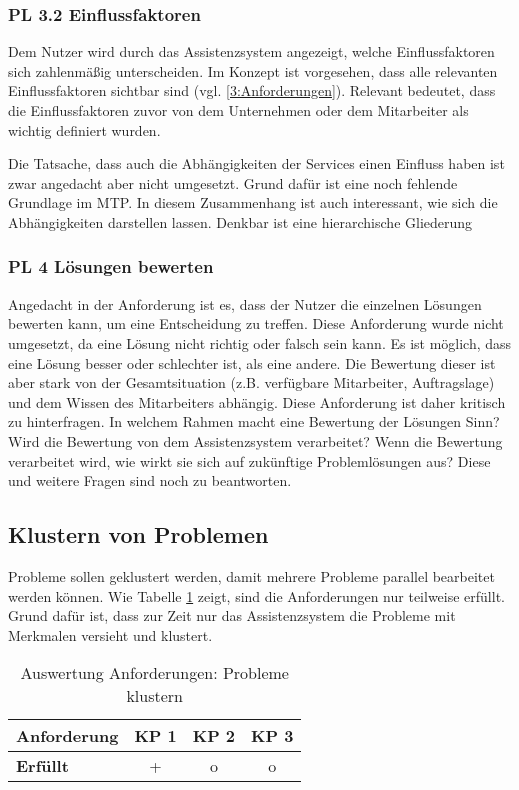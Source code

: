 \subsubsection*{PL 3.2 Einflussfaktoren}
Dem Nutzer wird durch das Assistenzsystem angezeigt, welche Einflussfaktoren sich zahlenmäßig unterscheiden. Im Konzept ist vorgesehen, dass alle relevanten Einflussfaktoren sichtbar sind (vgl. \ref{3:Anforderungen}). Relevant bedeutet, dass die Einflussfaktoren zuvor von dem Unternehmen oder dem Mitarbeiter als wichtig definiert wurden.

Die Tatsache, dass auch die Abhängigkeiten der Services einen Einfluss haben ist zwar angedacht aber nicht umgesetzt. Grund dafür ist eine noch fehlende Grundlage im MTP. In diesem Zusammenhang ist auch interessant, wie sich die Abhängigkeiten darstellen lassen. Denkbar ist eine hierarchische Gliederung 

\subsubsection*{PL 4 Lösungen bewerten}
Angedacht in der Anforderung ist es, dass der Nutzer die einzelnen Lösungen bewerten kann, um eine Entscheidung zu treffen. Diese Anforderung wurde nicht umgesetzt, da eine Lösung nicht richtig oder falsch sein kann. Es ist möglich, dass eine Lösung besser oder schlechter ist, als eine andere. Die Bewertung dieser ist aber stark von der Gesamtsituation (z.B. verfügbare Mitarbeiter, Auftragslage) und dem Wissen des Mitarbeiters abhängig. Diese Anforderung ist daher kritisch zu hinterfragen. In welchem Rahmen macht eine Bewertung der Lösungen Sinn? Wird die Bewertung von dem Assistenzsystem verarbeitet? Wenn die Bewertung verarbeitet wird, wie wirkt sie sich auf zukünftige Problemlösungen aus? Diese und weitere Fragen sind noch zu beantworten.

\subsection{Klustern von Problemen}
Probleme sollen geklustert werden, damit mehrere Probleme parallel bearbeitet werden können. Wie Tabelle \ref{tab:Anforderungen-Probleme} zeigt, sind die Anforderungen nur teilweise erfüllt. Grund dafür ist, dass zur Zeit nur das Assistenzsystem die Probleme mit Merkmalen versieht und klustert. 

\begin{table}[htbp]
\caption{Auswertung Anforderungen: Probleme klustern}
\centering
\begin{tabular}{l|c|c|c}
\textbf{Anforderung} & KP 1 & KP 2 & KP 3\\
\hline
\textbf{Erfüllt} & + & o & o\\
\end{tabular}
\label{tab:Anforderungen-Probleme}
\end{table}

